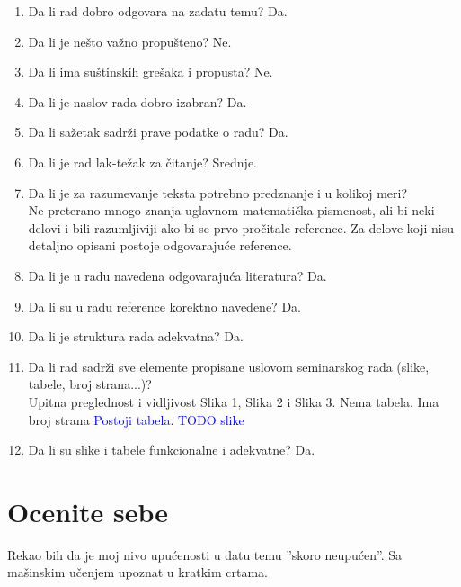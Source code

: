 \documentclass[a4paper]{report}
\newcommand{\odgovor}[1]{\textcolor{blue}{#1}}
\begin{document}
\begin{enumerate}
\item Da li rad dobro odgovara na zadatu temu? Da.\\
\item Da li je nešto važno propušteno? Ne.\\
\item Da li ima suštinskih grešaka i propusta? Ne.\\
\item Da li je naslov rada dobro izabran? Da.\\
\item Da li sažetak sadrži prave podatke o radu?  Da.\\
\item Da li je rad lak-težak za čitanje?  Srednje.\\
\item Da li je za razumevanje teksta potrebno predznanje i u kolikoj meri?\\ Ne
preterano mnogo znanja uglavnom matematička pismenost, ali bi neki delovi i bili razumljiviji ako bi se prvo pročitale reference. Za
delove koji nisu detaljno opisani postoje odgovarajuće reference.\\
\item Da li je u radu navedena odgovarajuća literatura?  Da.\\
\item Da li su u radu reference korektno navedene?  Da.\\
\item Da li je struktura rada adekvatna?  Da.\\
\item Da li rad sadrži sve elemente propisane uslovom seminarskog rada (slike, tabele, broj strana...)?\\
Upitna preglednost i vidljivost Slika 1, Slika 2 i Slika 3. Nema tabela. Ima broj strana    \odgovor{Postoji tabela. TODO slike} \\
\item Da li su slike i tabele funkcionalne i adekvatne? Da.\\
\end{enumerate}

\section{Ocenite sebe}
Rekao bih da je moj nivo upućenosti u datu temu ”skoro neupućen”.
Sa mašinskim učenjem upoznat u kratkim crtama.
\end{document}
